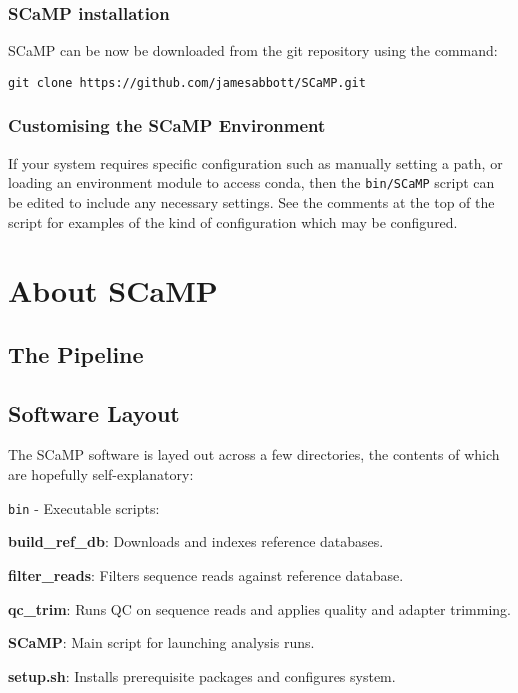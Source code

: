 \documentclass[a4paper,10pt]{article}
\newenvironment{tight_itemize}{
\begin{itemize}
  \setlength{\itemsep}{0pt}
  \setlength{\parskip}{0pt}
}{\end{itemize}}
\begin{document}
\subsubsection{SCaMP installation}

SCaMP can be now be downloaded from the git repository using the command:                                           

{\tt git clone https://github.com/jamesabbott/SCaMP.git}

\subsubsection{Customising the SCaMP Environment}

If your system requires specific configuration such as manually setting a path,
or loading an environment module to access conda, then the {\tt bin/SCaMP}
script can be edited to include any necessary settings. See the comments at the
top of the script for examples of the kind of configuration which may be
configured.

\section{About SCaMP}

\subsection{The Pipeline} \label{pipeline}


\subsection{Software Layout}

The SCaMP software is layed out across a few directories, the contents of which are hopefully self-explanatory:

{\tt bin} - Executable scripts:
\begin{tight_itemize}
\item \textbf{build\_ref\_db}: Downloads and indexes reference databases.
\item \textbf{filter\_reads}: Filters sequence reads against reference database.
\item \textbf{qc\_trim}: Runs QC on sequence reads and applies quality and adapter trimming.
\item \textbf{SCaMP}: Main script for launching analysis runs.
\item \textbf{setup.sh}: Installs prerequisite packages and configures system.
\end{tight_itemize}
\end{document}
